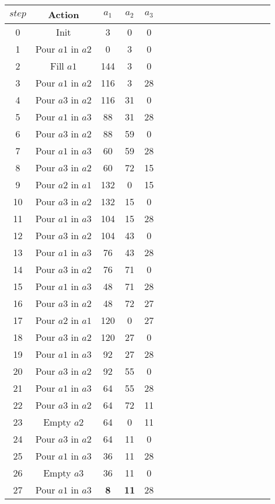  \begin{center}
\begin{tabular}{|c|c|c|c|c|c|c|c|c|c|c|c|c|c|c|c|c|}
  \hline
  $step$ & Action & $a_1$ & $a_2$ & $a_3$  \\
  \hline
  0  & Init  & 3 & 0 & 0 \\
  1  & Pour $a1$ in $a2$  & 0 & 3 & 0 \\
  2  & Fill $a1$          & 144 & 3 & 0 \\
  3  & Pour $a1$ in $a2$  & 116 & 3 & 28 \\
  4  & Pour $a3$ in $a2$  & 116 & 31 & 0 \\
  5  & Pour $a1$ in $a3$  & 88 &  31 & 28 \\
  6  & Pour $a3$ in $a2$  & 88 &  59 & 0 \\
  7  & Pour $a1$ in $a3$  & 60 &  59 & 28 \\
  8  & Pour $a3$ in $a2$  & 60 &  72 & 15 \\
  9  & Pour $a2$ in $a1$  & 132 &  0 & 15 \\
  10 & Pour $a3$ in $a2$  & 132 & 15 & 0 \\
  11 & Pour $a1$ in $a3$  & 104 & 15 & 28 \\
  12 & Pour $a3$ in $a2$  & 104 & 43 & 0 \\
  13 & Pour $a1$ in $a3$  &  76 & 43 & 28 \\
  14 & Pour $a3$ in $a2$  &  76 & 71 & 0 \\
  15 & Pour $a1$ in $a3$  &  48 & 71 & 28 \\
  16 & Pour $a3$ in $a2$  &  48 & 72 & 27 \\
  17 & Pour $a2$ in $a1$  &  120 & 0 & 27 \\
  18 & Pour $a3$ in $a2$  &  120 & 27 & 0 \\
  19 & Pour $a1$ in $a3$  &  92 & 27 & 28 \\
  20 & Pour $a3$ in $a2$  &  92 & 55 & 0 \\
  21 & Pour $a1$ in $a3$  &  64 & 55 & 28 \\
  22 & Pour $a3$ in $a2$  &  64 & 72 & 11 \\
  23 & Empty $a2$         &  64 & 0  & 11 \\
  24 & Pour $a3$ in $a2$  &  64 & 11 & 0 \\
  25 & Pour $a1$ in $a3$  &  36 & 11 & 28 \\
  26 & Empty $a3$         &  36 & 11 & 0 \\
  27 & Pour $a1$ in $a3$  &   \textbf{8} & \textbf{11} & 28 \\
  \hline
\end{tabular}
\end{center}

